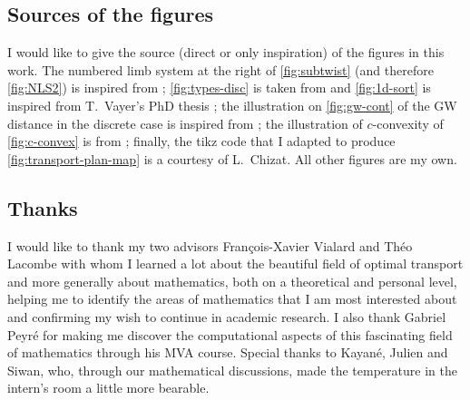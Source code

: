 \subsection*{Sources of the figures}
I would like to give the source (direct or only inspiration) of the figures in this work. The numbered limb system at the right of \cref{fig:subtwist} (and therefore \cref{fig:NLS2}) is inspired from \cite{ahmad2011optimal}; \cref{fig:types-disc} is taken from and \cref{fig:1d-sort} is inspired from T.~Vayer's PhD thesis \cite{vayer2020contribution}; the illustration on \cref{fig:gw-cont} of the GW distance in the discrete case is inspired from \cite{peyre2019computational}; the illustration of $c$-convexity of \cref{fig:c-convex} is from \cite{villani2009optimal}; finally, the tikz code that I adapted to produce \cref{fig:transport-plan-map} is a courtesy of L.~Chizat. All other figures are my own.

\subsection*{Thanks}
I would like to thank my two advisors François-Xavier Vialard and Théo Lacombe with whom I learned a lot about the beautiful field of optimal transport and more generally about mathematics, both on a theoretical and personal level, helping me to identify the areas of mathematics that I am most interested about and confirming my wish to continue in academic research. I also thank Gabriel Peyré for making me discover the computational aspects of this fascinating field of mathematics through his MVA course. Special thanks to Kayané, Julien and Siwan, who, through our mathematical discussions, made the temperature in the intern's room a little more bearable.
